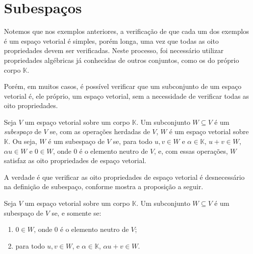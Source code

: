 \section{Subespaços}
Notemos que nos exemplos anteriores, a verificação de que cada um dos exemplos é um espaço vetorial é simples, porém longa, uma vez que todas as oito propriedades devem ser verificadas.
Neste processo, foi necessário utilizar propriedades algébricas já conhecidas de outros conjuntos, como os do próprio corpo $\mathbb K$.

Porém, em muitos casos, é possível verificar que um subconjunto de um espaço vetorial é, ele próprio, um espaço vetorial, sem a necessidade de verificar todas as oito propriedades.
\begin{definition}
    Seja $V$ um espaço vetorial sobre um corpo $\mathbb K$.
    Um subconjunto $W \subseteq V$ é um \emph{subespaço} de $V$ se, com as operações herdadas de $V$, $W$ é um espaço vetorial sobre $\mathbb K$.
    Ou seja, $W$ é um subespaço de $V$ se, para todo $u, v \in W$ e $\alpha \in \mathbb K$, $u+v\in W$, $\alpha u \in W$ e $0 \in W$, onde $0$ é o elemento neutro de $V$, e, com essas operações, $W$ satisfaz as oito propriedades de espaço vetorial.
\end{definition}
A verdade é que verificar as oito propriedades de espaço vetorial é desnecessário na definição de subespaço, conforme mostra a proposição a seguir.
\begin{proposition}\label{prop:subespaco}
    Seja $V$ um espaço vetorial sobre um corpo $\mathbb K$.
    Um subconjunto $W \subseteq V$ é um subespaço de $V$ se, e somente se:
    \begin{enumerate}[label=(\roman*)]
        \item $0 \in W$, onde $0$ é o elemento neutro de $V$;
        \item para todo $u, v \in W$, e $\alpha \in \mathbb K$, $\alpha u + v \in W$.
    \end{enumerate}
\end{proposition}
